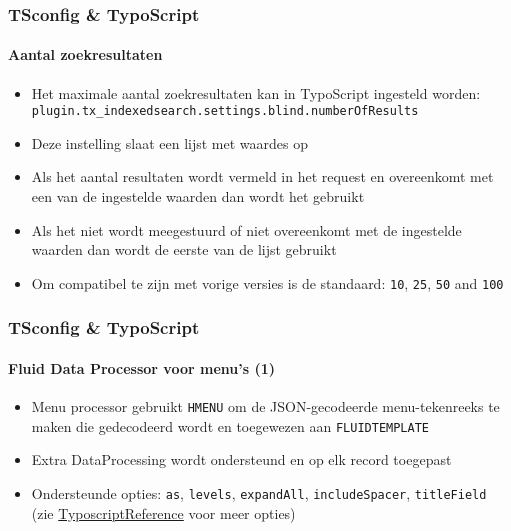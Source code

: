 \begin{frame}[fragile]
	\frametitle{TSconfig \& TypoScript}
	\framesubtitle{Aantal zoekresultaten}

	\begin{itemize}
		\item Het maximale aantal zoekresultaten kan in TypoScript ingesteld worden:\newline
			\texttt{plugin.tx\_indexedsearch.settings.blind.numberOfResults}
		\item Deze instelling slaat een lijst met waardes op
		\item Als het aantal resultaten wordt vermeld in het request en overeenkomt met een van
			de ingestelde waarden dan wordt het gebruikt
		\item Als het niet wordt meegestuurd of niet overeenkomt met de ingestelde waarden dan
		 	wordt de eerste van de lijst gebruikt
		\item Om compatibel te zijn met vorige versies is de standaard:\newline
			\texttt{10}, \texttt{25}, \texttt{50} and \texttt{100}
	\end{itemize}

\end{frame}

\begin{frame}[fragile]
	\frametitle{TSconfig \& TypoScript}
	\framesubtitle{Fluid Data Processor voor menu's (1)}

	\begin{itemize}
		\item Menu processor gebruikt \texttt{HMENU} om de JSON-gecodeerde menu-tekenreeks te maken
			die gedecodeerd wordt en toegewezen aan \texttt{FLUIDTEMPLATE}
		\item Extra DataProcessing wordt ondersteund en op elk record toegepast
		\item Ondersteunde opties: \texttt{as}, \texttt{levels}, \texttt{expandAll}, \texttt{includeSpacer},
			\texttt{titleField}
			(zie \href{https://docs.typo3.org/typo3cms/TyposcriptReference/ContentObjects/Hmenu/Index.html}{TyposcriptReference} voor meer opties)
	\end{itemize}

\end{frame}

